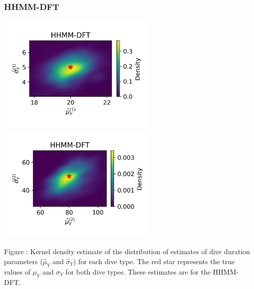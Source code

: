 \documentclass{article}
\begin{document}
        \subsubsection{HHMM-DFT}
        \begin{center}
        \includegraphics[width=3in]{../Plots/hhmm_FV_uncorr_MLE_density_dive_duration_-1_0.png}
        \includegraphics[width=3in]{../Plots/hhmm_FV_uncorr_MLE_density_dive_duration_-1_1.png}
        \end{center}

        \noindent Figure : Kernel density estimate of the distribution of estimates of dive duration parameters ($\hat \mu_Y$ and $\hat \sigma_Y$) for each dive type. The red star represents the true values of $\mu_Y$ and $\sigma_Y$ for both dive types. These estimates are for the HHMM-DFT.
        \addtocounter{fignum}{1}
        
\end{document}
